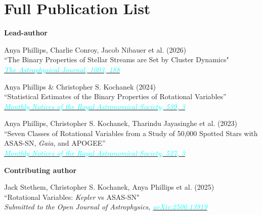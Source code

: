 \documentclass[letterpaper,11pt]{article}
\newcommand{\resumeSubHeadingListStart}{\begin{itemize}[leftmargin=0.15in, label={}]}
\begin{document}
\section{Full Publication List}
{ \textbf{Lead-author}}
\vspace{-5pt}
\begin{etaremune}
  \item Anya Phillips, Charlie Conroy, Jacob Nibauer et al. (2026)\\
  ``The Binary Properties of Stellar Streams are Set by Cluster Dynamics"\\
  \emph{\href{https://iopscience.iop.org/article/10.3847/1538-4357/ae680b}{\textcolor{cyan}{The Astrophysical Journal, 1003, 188}}}
  \item Anya Phillips \& Christopher S. Kochanek (2024)\\
  ``Statistical Estimates of the Binary Properties of Rotational Variables''\\
  \emph{\href{https://doi.org/10.1093/mnras/staf634}{\textcolor{cyan}{Monthly Notices of the Royal Astronomical Society, 539, 3}}}
  \item Anya Phillips, Christopher S. Kochanek, Tharindu Jayasinghe et al. (2023)\\
  ``Seven Classes of Rotational Variables from a Study of 50,000 Spotted Stars with ASAS-SN, \emph{Gaia}, and APOGEE''\\
  \emph{\href{https://doi.org/10.1093/mnras/stad3564}{\textcolor{cyan}{Monthly Notices of the Royal Astronomical Society, 527, 3}}}
\end{etaremune}
{ \textbf{Contributing author}}
\vspace{-5pt}
\begin{etaremune}
  \item Jack Stethem, Christopher S. Kochanek, Anya Phillips et al. (2025)\\
  ``Rotational Variables: \emph{Kepler} vs ASAS-SN"\\
  \emph{Submitted to the Open Journal of Astrophysics, \href{https://arxiv.org/abs/2506.13919}{\textcolor{cyan}{arXiv:2506.13919}}}
\end{etaremune}

\end{document}
